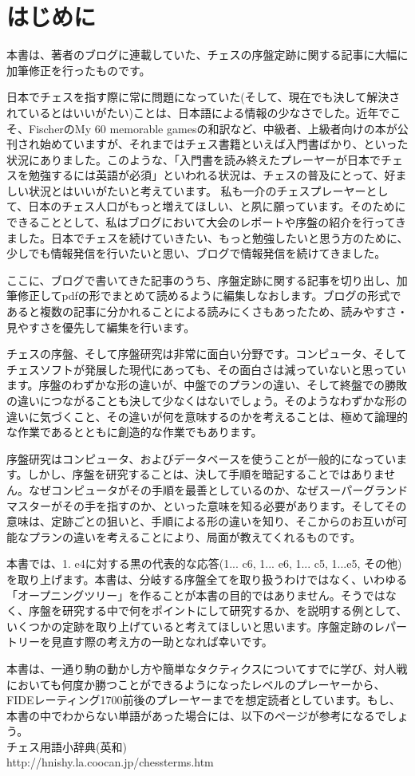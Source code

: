 \section*{はじめに}

本書は、著者のブログに連載していた、チェスの序盤定跡に関する記事に大幅に加筆修正を行ったものです。

日本でチェスを指す際に常に問題になっていた(そして、現在でも決して解決されているとはいいがたい)ことは、日本語による情報の少なさでした。近年でこそ、FischerのMy 60 memorable gamesの和訳など、中級者、上級者向けの本が公刊され始めていますが、それまではチェス書籍といえば入門書ばかり、といった状況にありました。このような、「入門書を読み終えたプレーヤーが日本でチェスを勉強するには英語が必須」といわれる状況は、チェスの普及にとって、好ましい状況とはいいがたいと考えています。
私も一介のチェスプレーヤーとして、日本のチェス人口がもっと増えてほしい、と夙に願っています。そのためにできることとして、私はブログにおいて大会のレポートや序盤の紹介を行ってきました。日本でチェスを続けていきたい、もっと勉強したいと思う方のために、少しでも情報発信を行いたいと思い、ブログで情報発信を続けてきました。

ここに、ブログで書いてきた記事のうち、序盤定跡に関する記事を切り出し、加筆修正してpdfの形でまとめて読めるように編集しなおします。ブログの形式であると複数の記事に分かれることによる読みにくさもあったため、読みやすさ・見やすさを優先して編集を行います。

チェスの序盤、そして序盤研究は非常に面白い分野です。コンピュータ、そしてチェスソフトが発展した現代にあっても、その面白さは減っていないと思っています。序盤のわずかな形の違いが、中盤でのプランの違い、そして終盤での勝敗の違いにつながることも決して少なくはないでしょう。そのようなわずかな形の違いに気づくこと、その違いが何を意味するのかを考えることは、極めて論理的な作業であるとともに創造的な作業でもあります。

序盤研究はコンピュータ、およびデータベースを使うことが一般的になっています。しかし、序盤を研究することは、決して手順を暗記することではありません。なぜコンピュータがその手順を最善としているのか、なぜスーパーグランドマスターがその手を指すのか、といった意味を知る必要があります。そしてその意味は、定跡ごとの狙いと、手順による形の違いを知り、そこからのお互いが可能なプランの違いを考えることにより、局面が教えてくれるものです。

本書では、1. e4に対する黒の代表的な応答(1... c6, 1... e6, 1... c5, 1...e5, その他)を取り上げます。本書は、分岐する序盤全てを取り扱うわけではなく、いわゆる「オープニングツリー」を作ることが本書の目的ではありません。そうではなく、序盤を研究する中で何をポイントにして研究するか、を説明する例として、いくつかの定跡を取り上げていると考えてほしいと思います。序盤定跡のレパートリーを見直す際の考え方の一助となれば幸いです。

本書は、一通り駒の動かし方や簡単なタクティクスについてすでに学び、対人戦においても何度か勝つことができるようになったレベルのプレーヤーから、FIDEレーティング1700前後のプレーヤーまでを想定読者としています。もし、本書の中でわからない単語があった場合には、以下のページが参考になるでしょう。\\
チェス用語小辞典(英和)\\
http://hnishy.la.coocan.jp/chessterms.htm
